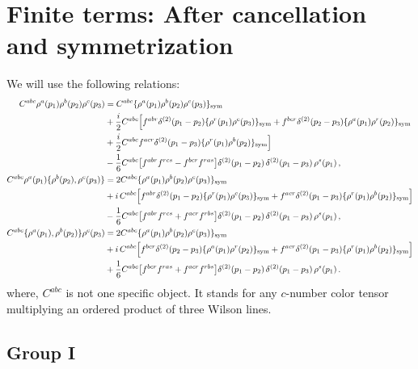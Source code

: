 \documentclass[9pt]{article}
\numberwithin{equation}{section}
\begin{document}
\section{Finite terms: After cancellation and symmetrization}\label{sec:D}
We will use the following relations: 
\begin{align}
C^{abc}\rho^{a}(p_{1})\rho^{b}(p_{2})\rho^{c}(p_{3})&=C^{abc}\{\rho^{a}(p_{1})\rho^{b}(p_{2})\rho^{c}(p_{3})\}_{\rm sym}\notag\\
&+\frac{i}{2}C^{abc}\Big[f^{abr}\delta^{(2)}(p_{1}-p_{2})\{\rho^{r}(p_{1})\rho^{c}(p_{3})\}_{\rm sym}+f^{bcr}\delta^{(2)}(p_{2}-p_{3})\{\rho^{a}(p_{1})\rho^{r}(p_{2})\}_{\rm sym}\notag\\
&+\frac{i}{2}C^{abc}f^{acr}\delta^{(2)}(p_{1}-p_{3})\{\rho^{r}(p_{1})\rho^{b}(p_{2})\}_{\rm sym}\Big]\notag\\
&-\frac{1}{6}C^{abc}\big[f^{abr}f^{rcs}-f^{bcr}f^{ras}\big]\delta^{(2)}(p_{1}-p_{2})\,\delta^{(2)}(p_{1}-p_{3})\,\rho^{s}(p_{1})\,,\label{eq:D-ord}\\
C^{abc}\rho^{a}(p_{1})\{\rho^{b}(p_{2}),\rho^{c}(p_{3})\}&=2C^{abc}\{\rho^{a}(p_{1})\rho^{b}(p_{2})\rho^{c}(p_{3})\}_{\rm sym}\notag\\
&+i\,C^{abc}\Big[f^{abr}\delta^{(2)}(p_{1}-p_{2})\{\rho^{r}(p_{1})\rho^{c}(p_{3})\}_{\rm sym}+f^{acr}\delta^{(2)}(p_{1}-p_{3})\{\rho^{r}(p_{1})\rho^{b}(p_{2})\}_{\rm sym}\Big]\notag\\
&-\frac{1}{6}C^{abc}\big[f^{abr}f^{rcs}+f^{acr}f^{rbs}\big]\delta^{(2)}(p_{1}-p_{2})\,\delta^{(2)}(p_{1}-p_{3})\,\rho^{s}(p_{1})\,,\label{eq:D-r12}\\
C^{abc}\{\rho^{a}(p_{1}),\rho^{b}(p_{2})\}\rho^{c}(p_{3})&=2C^{abc}\{\rho^{a}(p_{1})\rho^{b}(p_{2})\rho^{c}(p_{3})\}_{\rm sym}\notag\\
&+i\,C^{abc}\Big[f^{bcr}\delta^{(2)}(p_{2}-p_{3})\{\rho^{a}(p_{1})\rho^{r}(p_{2})\}_{\rm sym}+f^{acr}\delta^{(2)}(p_{1}-p_{3})\{\rho^{r}(p_{1})\rho^{b}(p_{2})\}_{\rm sym}\Big]\notag\\
&+\frac{1}{6}C^{abc}\big[f^{bcr}f^{ras}+f^{acr}f^{rbs}\big]\delta^{(2)}(p_{1}-p_{2})\,\delta^{(2)}(p_{1}-p_{3})\,\rho^{s}(p_{1})\,.\label{eq:D-r21}
\end{align}
where, $C^{abc}$ is not one specific object. It stands for any $c$-number color tensor multiplying an ordered product of three Wilson lines. 

\subsection{Group I}
\end{document}
